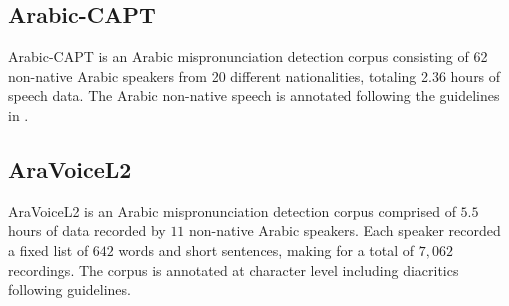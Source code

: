 \subsection{Arabic-CAPT \cite{algabri2022mispronunciation}}
Arabic-CAPT is an Arabic mispronunciation detection corpus consisting of 62 non-native Arabic speakers from 20 different nationalities, totaling 2.36 hours of speech data. The Arabic non-native speech is annotated following the guidelines in \cite{L2-ARCTIC}.


\subsection{AraVoiceL2 \cite{speechblender}}
AraVoiceL2 is an Arabic mispronunciation detection corpus comprised of $5.5$ hours of data recorded by $11$ non-native Arabic speakers. Each speaker recorded a fixed list of $642$ words and short sentences, making for a total of $7,062$ recordings. The corpus is annotated at character level including diacritics following \cite{speechocean762} guidelines.

  






